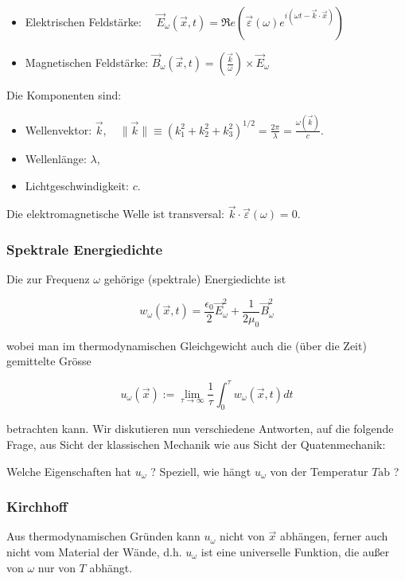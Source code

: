 \documentclass[10pt, letterpaper]{article}
\begin{document}
\begin{itemize}
  \item Elektrischen Feldstärke: $\quad \vec{E}_{\omega}(\vec{x}, t)=\Re e\left(\vec{\varepsilon}(\omega) e^{i(\omega t-\vec{k} \cdot \vec{x})}\right)$
  \item Magnetischen Feldstärke: $\vec{B}_{\omega}(\vec{x}, t)=\left(\frac{\vec{k}}{\omega}\right) \times \vec{E}_{\omega}$
\end{itemize}

Die Komponenten sind:

\begin{itemize}
  \item Wellenvektor: $\vec{k}, \quad\|\vec{k}\| \equiv\left(k_{1}^{2}+k_{2}^{2}+k_{3}^{2}\right)^{1 / 2}=\frac{2 \pi}{\lambda}=\frac{\omega(\vec{k})}{c}$.
  \item Wellenlänge: $\lambda$,
  \item Lichtgeschwindigkeit: $c$.
\end{itemize}

Die elektromagnetische Welle ist transversal: $\vec{k} \cdot \vec{\varepsilon}(\omega)=0$.

\subsubsection*{Spektrale Energiedichte}
Die zur Frequenz $\omega$ gehörige (spektrale) Energiedichte ist

$$
w_{\omega}(\vec{x}, t)=\frac{\epsilon_{0}}{2} \vec{E}_{\omega}^{2}+\frac{1}{2 \mu_{0}} \vec{B}_{\omega}^{2}
$$

wobei man im thermodynamischen Gleichgewicht auch die (über die Zeit) gemittelte Grösse

$$
u_{\omega}(\vec{x}):=\lim _{\tau \rightarrow \infty} \frac{1}{\tau} \int_{0}^{\tau} w_{\omega}(\vec{x}, t) d t
$$

betrachten kann. Wir diskutieren nun verschiedene Antworten, auf die folgende Frage, aus Sicht der klassischen Mechanik wie aus Sicht der Quatenmechanik:

\begin{displayquote}
Welche Eigenschaften hat $u_{\omega}$ ? Speziell, wie hängt $u_{\omega}$ von der Temperatur $T \mathrm{ab}$ ?
\end{displayquote}

\subsubsection*{Kirchhoff}
Aus thermodynamischen Gründen kann $u_{\omega}$ nicht von $\vec{x}$ abhängen, ferner auch nicht vom Material der Wände, d.h. $u_{\omega}$ ist eine universelle Funktion, die außer von $\omega$ nur von $T$ abhängt.
\end{document}
